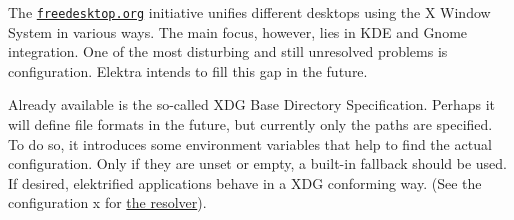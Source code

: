 The \href{https://freedesktop.org}{\tt freedesktop.\+org} initiative unifies different desktops using the X Window System in various ways. The main focus, however, lies in K\+DE and Gnome integration. One of the most disturbing and still unresolved problems is configuration. Elektra intends to fill this gap in the future.

Already available is the so-\/called X\+DG Base Directory Specification. Perhaps it will define file formats in the future, but currently only the paths are specified. To do so, it introduces some environment variables that help to find the actual configuration. Only if they are unset or empty, a built-\/in fallback should be used. If desired, elektrified applications behave in a X\+DG conforming way. (See the configuration x for \hyperlink{autotoc_md586_src_plugins_resolver_README_md}{the resolver}). 